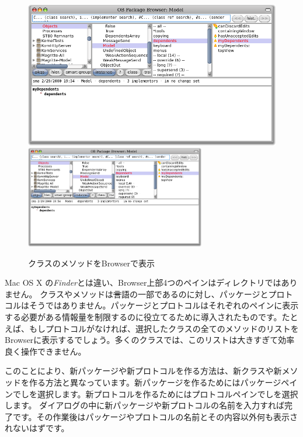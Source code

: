 \documentclass[a4paper,10pt,twoside]{book}
\begin{document}
\begin{figure}[htbp]
   \centering
   \ifluluelse
	   {\includegraphics[width=\textwidth]{SystemBrowserMyDependents}}
	   {\includegraphics[width=0.7\textwidth]{SystemBrowserMyDependents}}
   \caption{クラスのメソッドをBrowserで表示
   }
\end{figure}

Mac OS X の\emph{Finder}とは違い、Browser上部4つのペインはディレクトリではありません。
クラスやメソッドは\st 言語の一部であるのに対し、パッケージとプロトコルはそうではありません。パッケージとプロトコルはそれぞれのペインに表示する必要がある情報量を制限するのに役立てるために導入されたものです。たとえば、もしプロトコルがなければ、選択したクラスの全てのメソッドのリストをBrowserに表示するでしょう。多くのクラスでは、このリストは大きすぎて効率良く操作できません。 

このことにより、新パッケージや新プロトコルを作る方法は、新クラスや新メソッドを作る方法と異なっています。新パッケージを作るためにはパッケージペインで\actclick しを選択します。新プロトコルを作るためにはプロトコルペインで\actclick しを選択します。
ダイアログの中に新パッケージや新プロトコルの名前を入力すれば完了です。その作業後はパッケージやプロトコルの名前とその内容以外何も表示されないはずです。
\end{document}

